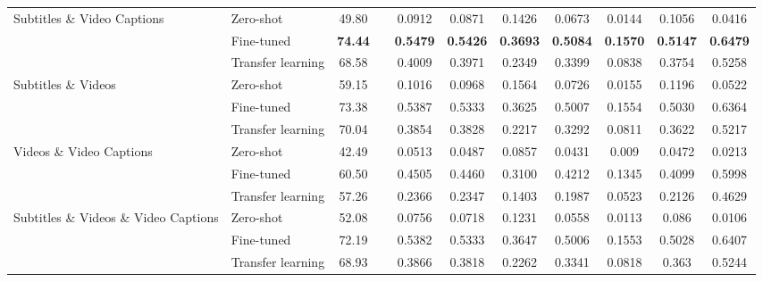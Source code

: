 \begin{table*}[t]
{\begin{tabular}{llccccccccc}
\multirow{3}{*}{Subtitles \& Video Captions} & Zero-shot & 49.80&& 0.0912&	0.0871&	0.1426&	0.0673&	0.0144&	0.1056&	0.0416 \\
& Fine-tuned & \textbf{74.44}&& \textbf{0.5479}&	\textbf{0.5426}&	\textbf{0.3693}&	\textbf{0.5084}&	\textbf{0.1570}&	\textbf{0.5147}&	\textbf{0.6479} \\
& Transfer learning & 68.58&& 0.4009&	0.3971&	0.2349&	0.3399&	0.0838&	0.3754&	0.5258 \\\midrule

\multirow{3}{*}{Subtitles \& Videos} & Zero-shot & 59.15&& 0.1016&	0.0968&	0.1564&	0.0726&	0.0155&	0.1196&	0.0522  \\
& Fine-tuned & 73.38&& 0.5387&	0.5333&	0.3625&	0.5007&	0.1554&	0.5030&	0.6364 \\
& Transfer learning & 70.04&& 0.3854&	0.3828&	0.2217&	0.3292&	0.0811&	0.3622&	0.5217 \\\midrule

\multirow{3}{*}{Videos \& Video Captions} & Zero-shot & 42.49&& 0.0513&	0.0487&	0.0857&	0.0431&	0.009&	0.0472&	0.0213 \\
& Fine-tuned & 60.50&& 0.4505&	0.4460&	0.3100&	0.4212&	0.1345&	0.4099&	0.5998 \\
& Transfer learning & 57.26&&	0.2366&	0.2347&	0.1403&	0.1987&	0.0523&	0.2126&	0.4629 \\\midrule

\multirow{3}{*}{Subtitles \& Videos \& Video Captions} & Zero-shot & 52.08&& 0.0756&	0.0718&	0.1231&	0.0558&	0.0113&	0.086&	0.0106 \\
& Fine-tuned & 72.19&& 0.5382&	0.5333&	0.3647&	0.5006&	0.1553&	0.5028&	0.6407 \\
& Transfer learning & 68.93&& 0.3866&	0.3818&	0.2262&	0.3341&	0.0818&	0.363&	0.5244 \\
\bottomrule
\end{tabular}
}
\label{tab:knowitx}
\end{table*}






